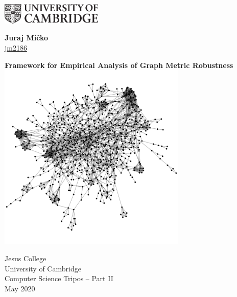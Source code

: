 \documentclass[12pt,a4paper,twoside,openany]{report}
\begin{document}


    \pagestyle{empty}

    \begin{minipage}{.45\linewidth}
        \begin{flushleft}
            \includegraphics[height=10mm]{uc-black-white.eps}
        \end{flushleft}
    \end{minipage}
    \hfill
    \begin{minipage}{.45\linewidth}
        \begin{flushright}
            \Large \textbf{Juraj Mi\v{c}ko} \\
            \normalsize \href{mailto:jm2186@cam.ac.uk}{jm2186}
        \end{flushright}
    \end{minipage}

    \vspace*{45mm}
    \begin{center}
        \LARGE
        \textbf{Framework for Empirical Analysis of Graph Metric Robustness} \\[5mm]

        \vspace{5mm}
        \includegraphics[height=9cm]{cover_graph_img.png}
        \vspace{5mm}

        \Large
        Jesus College \\
        University of Cambridge \\[5mm]
        Computer Science Tripos -- Part II \\[5mm]
        May 2020
    \end{center}
\end{document}
